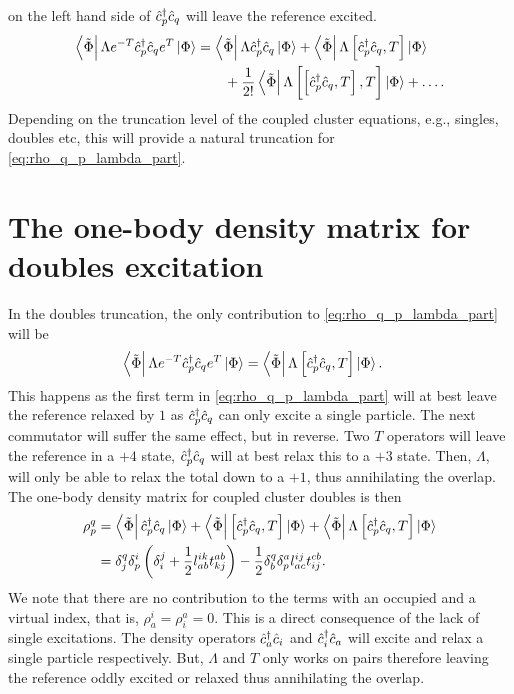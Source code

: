     on the left hand side of $\hat{c}_{p}^{\dagger}\hat{c}_{q}$ will leave the reference excited.
    \begin{align}
        \bra{\tilde{\Phi}}\Lambda e^{-T}\hat{c}_{p}^{\dagger}\hat{c}_{q}e^T\ket{\Phi}
        &= \bra{\tilde{\Phi}}\Lambda \hat{c}_{p}^{\dagger}\hat{c}_{q}\ket{\Phi}
        + \bra{\tilde{\Phi}}\Lambda \left[\hat{c}_{p}^{\dagger}\hat{c}_{q}, T\right]\ket{\Phi}
        \nonumber \\
        &\qquad
        + \frac{1}{2!}
        \bra{\tilde{\Phi}}\Lambda \left[\left[\hat{c}_{p}^{\dagger}\hat{c}_{q}, T\right], T\right]\ket{\Phi}
        + \dots.
        \label{eq:rho_q_p_lambda_part}
    \end{align}
    Depending on the truncation level of the coupled cluster equations, e.g.,
    singles, doubles etc, this will provide a natural truncation for
    \autoref{eq:rho_q_p_lambda_part}.

    \section{The one-body density matrix for doubles excitation}
        In the doubles truncation, the only contribution to
        \autoref{eq:rho_q_p_lambda_part} will be
        \begin{align}
            \bra{\tilde{\Phi}}\Lambda e^{-T}\hat{c}_{p}^{\dagger}\hat{c}_{q}e^T\ket{\Phi}
            &= \bra{\tilde{\Phi}}\Lambda \left[\hat{c}_{p}^{\dagger}\hat{c}_{q}, T\right]\ket{\Phi}.
        \end{align}
        This happens as the first term in \autoref{eq:rho_q_p_lambda_part} will
        at best leave the reference relaxed by $1$ as $\hat{c}_{p}^{\dagger}\hat{c}_{q}$ can only
        excite a single particle. The next commutator will suffer the same
        effect, but in reverse. Two $T$ operators will leave the reference in a
        $+4$ state, $\hat{c}_{p}^{\dagger}\hat{c}_{q}$ will at best relax this to a $+3$ state.
        Then, $\Lambda$, will only be able to relax the total down to a $+1$,
        thus annihilating the overlap. The one-body density matrix for coupled
        cluster doubles is then
        \begin{align}
            \rho^{q}_{p}
            &= \bra{\tilde{\Phi}}\hat{c}_{p}^{\dagger}\hat{c}_{q}\ket{\Phi}
            + \bra{\tilde{\Phi}}\left[\hat{c}_{p}^{\dagger}\hat{c}_{q}, T\right]\ket{\Phi}
            + \bra{\tilde{\Phi}}\Lambda \left[\hat{c}_{p}^{\dagger}\hat{c}_{q}, T\right]\ket{\Phi}
            \\
            &=
            \delta^{q}_{j} \delta^{i}_{p} \left( 
                \delta^{j}_{i}
                + \frac{1}{2} l^{ik}_{ab} t^{ab}_{kj}
             \right)
            - \frac{1}{2} \delta^{q}_{b} \delta^{a}_{p} l^{ij}_{ac} t^{cb}_{ij}.
        \end{align}
        We note that there are no contribution to the terms with an occupied and
        a virtual index, that is, $\rho^{i}_{a} = \rho^{a}_{i} = 0$. This is a
        direct consequence of the lack of single excitations. The density
        operators $\hat{c}_{a}^{\dagger}\hat{c}_{i}$ and $\hat{c}_{i}^{\dagger}\hat{c}_{a}$ will excite and relax a
        single particle respectively. But, $\Lambda$ and $T$ only works on pairs
        therefore leaving the reference oddly excited or relaxed thus
        annihilating the overlap.

